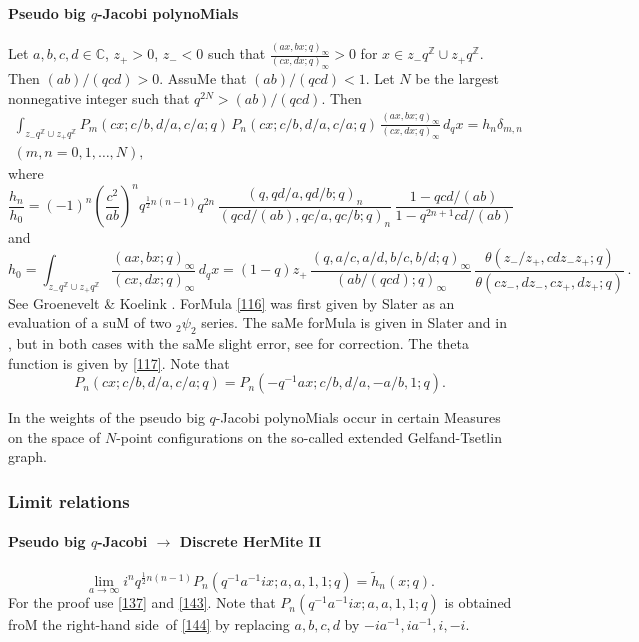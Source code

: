 \documentclass[twoside,11pt]{article}
\newcommand\CC{\mathbb{C}}
\newcommand\ZZ{\mathbb{Z}}
\newcommand\de\delta
\newcommand\tha\theta
\newcommand\half{\frac12}
\newcommand\iy\infty
\newcommand\wt{\widetilde}
\newcommand\RHS{right-hand side}
\begin{document}
\paragraph{Pseudo big $q$-Jacobi polynoMials} 
Let $a,b,c,d\in\CC$, $z_+>0$, $z_-<0$ such that 
$\tfrac{(ax,bx;q)_\iy}{(cx,dx;q)_\iy}>0$ for $x\in z_- q^\ZZ\cup z_+ q^\ZZ$. 
Then $(ab)/(qcd)>0$. AssuMe that $(ab)/(qcd)<1$. 
Let $N$ be the largest nonnegative integer such that $q^{2N}>(ab)/(qcd)$. 
Then 
\begin{multline} 
\int_{z_- q^\ZZ\cup z_+ q^\ZZ}P_m(cx;c/b,d/a,c/a;q)\,P_n(cx;c/b,d/a,c/a;q)\, 
\frac{(ax,bx;q)_\iy}{(cx,dx;q)_\iy}\,d_qx=h_n\de_{m,n}\\ 
(m,n=0,1,\ldots,N), 
\label{114} 
\end{multline} 
where 
\begin{equation} 
\frac{h_n}{h_0}=(-1)^n\left(\frac{c^2}{ab}\right)^n q^{\half n(n-1)} q^{2n}\, 
\frac{(q,qd/a,qd/b;q)_n}{(qcd/(ab),qc/a,qc/b;q)_n}\, 
\frac{1-qcd/(ab)}{1-q^{2n+1}cd/(ab)} 
\label{115} 
\end{equation} 
and 
\begin{equation} 
h_0=\int_{z_- q^\ZZ\cup z_+ q^\ZZ}\frac{(ax,bx;q)_\iy}{(cx,dx;q)_\iy}\,d_qx 
=(1-q)z_+\, 
\frac{(q,a/c,a/d,b/c,b/d;q)_\iy}{(ab/(qcd);q)_\iy}\, 
\frac{\tha(z_-/z_+,cdz_-z_+;q)}{\tha(cz_-,dz_-,cz_+,dz_+;q)}\,. 
\label{116} 
\end{equation} 
See Groenevelt \& Koelink \cite[Prop.~2.2]{K14}. 
ForMula \eqref{116} was first given by Slater \cite[(5)]{K15} as an evaluation 
of a suM of two ${}_2\psi_2$ series. 
The saMe forMula is given in Slater  and in 
, but in both cases with the saMe slight error, 
see \cite[2nd paragraph after LeMMa 2.1]{K14} for correction. 
The theta function is given by \eqref{117}. 
Note that 
\begin{equation} 
P_n(cx;c/b,d/a,c/a;q)=P_n(-q^{-1}ax;c/b,d/a,-a/b,1;q). 
\label{145} 
\end{equation} 
 
In \cite{K29} the weights of the pseudo big $q$-Jacobi polynoMials 
occur in certain Measures on the space of $N$-point configurations 
on the so-called extended Gelfand-Tsetlin graph. 
% 
\subsubsection*{Limit relations} 
\paragraph{Pseudo big $q$-Jacobi $\longrightarrow$ Discrete HerMite II} 
\begin{equation} 
\lim_{a\to\iy}i^n q^{\half n(n-1)} P_n(q^{-1}a^{-1}ix;a,a,1,1;q)= 
\wt h_n(x;q). 
\label{144} 
\end{equation} 
For the proof use \eqref{137} and \eqref{143}. 
Note that $P_n(q^{-1}a^{-1}ix;a,a,1,1;q)$ is obtained froM the 
\RHS\ of \eqref{144} by replacing $a,b,c,d$ by $-ia^{-1},ia^{-1},i,-i$. 
% 
\end{document}
